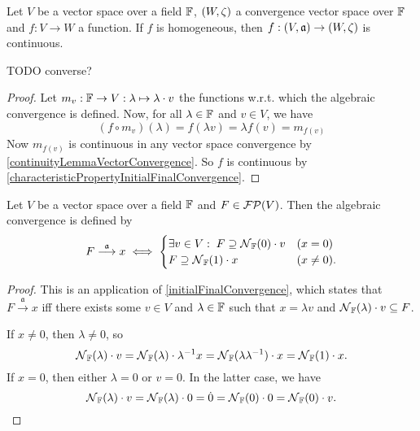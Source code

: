 \begin{lemma}
Let $V$ be a vector space  over a field $\mathbb{F}$, $\left( W,\zeta \right)$ a convergence vector space over $\mathbb{F}$ and $f: V\to W$ a function. If $f$ is homogeneous, then $f: \left( V, \mathfrak{a} \right)\to \left( W,\zeta \right)$ is continuous.
\end{lemma}
TODO converse?
\begin{proof}
Let $m_v: \mathbb{F} \to V: \lambda\mapsto \lambda \cdot v$ the functions w.r.t. which the algebraic convergence is defined. 
Now, for all $\lambda\in \mathbb{F}$ and $v\in V$, we have
\[ (f\circ m_v)(\lambda) = f(\lambda v) = \lambda f(v) = m_{f(v)} \]
Now $m_{f(v)}$ is continuous in any vector space convergence by \ref{continuityLemmaVectorConvergence}.
So $f$ is continuous by \ref{characteristicPropertyInitialFinalConvergence}.
\end{proof}

\begin{lemma} \label{algebraicConvergence}
Let $V$ be a vector space over a field $\mathbb{F}$ and $F\in \operatorname{\mathcal{FP}}(V)$. Then the algebraic convergence is defined by
\[ F \overset{\mathfrak{a}}{\longrightarrow} x \iff \begin{cases}
\exists v\in V: \;F \supseteq \operatorname{\mathcal{N}}_{\mathbb{F}}(0)\cdot v & (x = 0) \\
F \supseteq \operatorname{\mathcal{N}}_{\mathbb{F}}(1)\cdot x & (x \neq 0).
\end{cases}  \]
\end{lemma}
\begin{proof}
This is an application of \ref{initialFinalConvergence}, which states that $F \overset{\mathfrak{a}}{\longrightarrow} x$ iff there exists some $v\in V$ and $\lambda\in \mathbb{F}$ such that $x = \lambda v$ and $\operatorname{\mathcal{N}}_{\mathbb{F}}(\lambda)\cdot v \subseteq F$.

If $x\neq 0$, then $\lambda \neq 0$, so
\[ \operatorname{\mathcal{N}}_{\mathbb{F}}(\lambda)\cdot v = \operatorname{\mathcal{N}}_{\mathbb{F}}(\lambda)\cdot \lambda^{-1}x = \operatorname{\mathcal{N}}_{\mathbb{F}}(\lambda\lambda^{-1})\cdot x = \operatorname{\mathcal{N}}_{\mathbb{F}}(1)\cdot x. \]
If $x = 0$, then either $\lambda = 0$ or $v = 0$. In the latter case, we have
\[ \operatorname{\mathcal{N}}_{\mathbb{F}}(\lambda)\cdot v = \operatorname{\mathcal{N}}_{\mathbb{F}}(\lambda)\cdot 0 = \dot{0} = \operatorname{\mathcal{N}}_{\mathbb{F}}(0)\cdot 0 = \operatorname{\mathcal{N}}_{\mathbb{F}}(0)\cdot v. \]
\end{proof}

